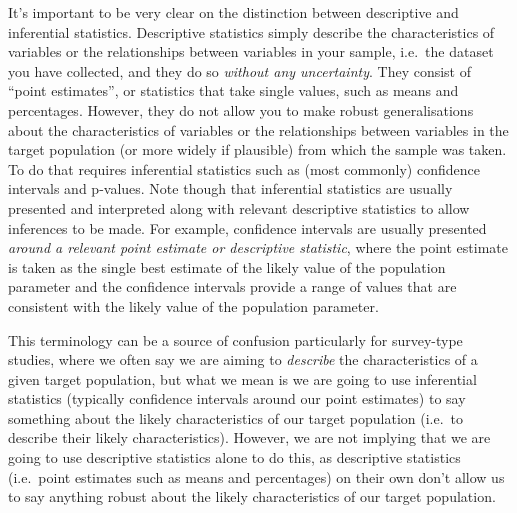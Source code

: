 \documentclass[
]{book}
\begin{document}
It's important to be very clear on the distinction between descriptive and inferential statistics. Descriptive statistics simply describe the characteristics of variables or the relationships between variables in your sample, i.e.~the dataset you have collected, and they do so \emph{without any uncertainty}. They consist of ``point estimates'', or statistics that take single values, such as means and percentages. However, they do not allow you to make robust generalisations about the characteristics of variables or the relationships between variables in the target population (or more widely if plausible) from which the sample was taken. To do that requires inferential statistics such as (most commonly) confidence intervals and p-values. Note though that inferential statistics are usually presented and interpreted along with relevant descriptive statistics to allow inferences to be made. For example, confidence intervals are usually presented \emph{around a relevant point estimate or descriptive statistic}, where the point estimate is taken as the single best estimate of the likely value of the population parameter and the confidence intervals provide a range of values that are consistent with the likely value of the population parameter.

This terminology can be a source of confusion particularly for survey-type studies, where we often say we are aiming to \emph{describe} the characteristics of a given target population, but what we mean is we are going to use inferential statistics (typically confidence intervals around our point estimates) to say something about the likely characteristics of our target population (i.e.~to describe their likely characteristics). However, we are not implying that we are going to use descriptive statistics alone to do this, as descriptive statistics (i.e.~point estimates such as means and percentages) on their own don't allow us to say anything robust about the likely characteristics of our target population.
\end{document}
